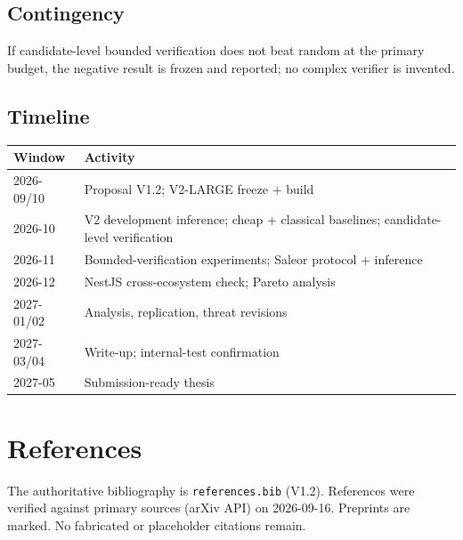 \documentclass[11pt,a4paper]{article}
\begin{document}
\subsection{Contingency}
If candidate-level bounded verification does not beat random at the primary
budget, the negative result is frozen and reported; no complex verifier is
invented.

\subsection{Timeline}
\begin{tabular}{ll}
\toprule
\textbf{Window} & \textbf{Activity} \\
\midrule
2026-09/10 & Proposal V1.2; V2-LARGE freeze + build \\
2026-10 & V2 development inference; cheap + classical baselines; candidate-level verification \\
2026-11 & Bounded-verification experiments; Saleor protocol + inference \\
2026-12 & NestJS cross-ecosystem check; Pareto analysis \\
2027-01/02 & Analysis, replication, threat revisions \\
2027-03/04 & Write-up; internal-test confirmation \\
2027-05 & Submission-ready thesis \\
\bottomrule
\end{tabular}

\section{References}
\label{sec:refs}

The authoritative bibliography is \texttt{references.bib} (V1.2). References
were verified against primary sources (arXiv API) on 2026-09-16. Preprints are
marked. No fabricated or placeholder citations remain.
\end{document}
